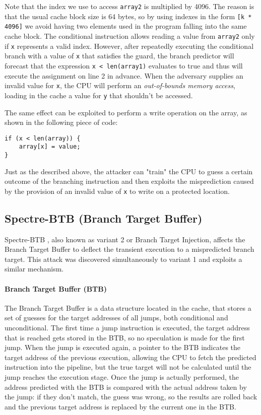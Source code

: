 \documentclass[target=mst,aauheader=aics]{thud}
\theoremstyle{definition}
\begin{document}
	Note that the index we use to access \texttt{array2} is multiplied by 4096. The reason is that the usual cache block size is 64 bytes, so by using indexes in the form \texttt{[k * 4096]} we avoid having two elements used in the program falling into the same cache block.
	The conditional instruction allows reading a value from \texttt{array2} only if \texttt{x} represents a valid index. However, after repeatedly executing the conditional branch with a value of \texttt{x} that satisfies the guard, the branch predictor will forecast that the expression \texttt{x < len(array1)} evaluates to true and thus will execute the assignment on line 2 in advance. When the adversary supplies an invalid value for \texttt{x}, the CPU will perform an \textit{out-of-bounds memory access}, loading in the cache a value for \texttt{y} that shouldn't be accessed.
	
	The same effect can be exploited to perform a write operation on the array, as shown in the following piece of code:
	
	\vspace{3mm}
	\begin{minipage}{.5\textwidth}
	\begin{lstlisting}
if (x < len(array)) { 
	array[x] = value; 
}
	\end{lstlisting} 
	\end{minipage}
 
	Just as the described above, the attacker can "train" the CPU to guess a certain outcome of the branching instruction and then exploits the misprediction caused by the provision of an invalid value of \texttt{x} to write on a protected location.
	\subsection{Spectre-BTB (Branch Target Buffer)}\label{sec:spectre-btb}
	Spectre-BTB \cite{Kocher2019} \cite{Canella2019}, also known as variant 2 or Branch Target Injection, affects the Branch Target Buffer to deflect the transient execution to a mispredicted branch target. This attack was discovered simultaneously to variant 1 and exploits a similar mechanism.
	
	\paragraph{Branch Target Buffer (BTB)} The Branch Target Buffer \cite{Perleberg1989} is a data structure located in the cache, that stores a set of guesses for the target addresses of all jumps, both conditional and unconditional. The first time a jump instruction is executed, the target address that is reached gets stored in the BTB, so no speculation is made for the first jump. When the jump is executed again, a pointer to the BTB indicates the target address of the previous execution, allowing the CPU to fetch the  predicted instruction into the pipeline, but the true target will not be calculated until the jump reaches the execution stage. Once the jump is actually performed, the address predicted with the BTB is compared with the actual address taken by the jump: if they don't match, the guess was wrong, so the results are rolled back and the previous target address is replaced by the current one in the BTB.
\end{document}
